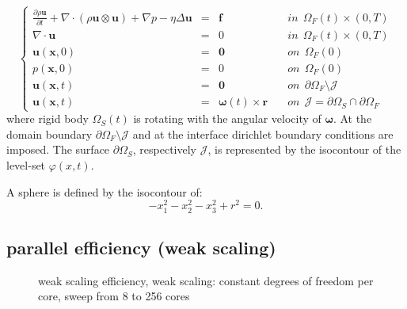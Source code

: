 \documentclass[a4paper,10pt]{report} %
\renewcommand{\vec}[1]{\textbf{#1}}
\newcommand{\Interface}{\mathcal{J}}
\begin{document}
\begin{equation}
\left\{ \begin{array} {rclll}
\frac{\partial \rho \vec{u}}{\partial t}+ \nabla \cdot ( \rho \vec{u} \otimes \vec{u}) + \nabla p - \eta \Delta \vec{u} & = & \vec{f} \quad & in \ \ \Omega_F(t) \times (0,T) \\
\nabla \cdot \vec{u} & = & 0 \quad & in \ \ \Omega_F(t) \times (0,T) \\
\vec{u}(\vec{x},0) & = & \vec{0} \quad & on \ \ \Omega_F(0) \\
p(\vec{x},0) & = & 0 \quad & on \ \ \Omega_F(0) \\
\vec{u}(\vec{x},t) & = & \vec{0} \quad & on \ \ \partial\Omega_F \setminus \Interface \\
\vec{u}(\vec{x},t) & = & \boldsymbol{\omega}(t) \times \vec{r} \quad & on \ \ \Interface = \partial\Omega_S \cap \partial\Omega_F 
\end{array} \right.
\end{equation}
where rigid body $\Omega_S(t)$ is rotating with the angular velocity of $\boldsymbol{\omega}$. At the domain boundary $\partial\Omega_F \setminus \Interface$ and at the interface dirichlet boundary conditions are imposed. The surface $\partial \Omega_S$, respectively $\Interface$, is represented by the isocontour of the level-set $\varphi(x,t)$.

A sphere is defined by the isocontour of: 
\begin{equation}
	-x_1^2-x_2^2-x_3^2+r^2=0.
\end{equation}

\subsection{parallel efficiency (weak scaling)}
\begin{figure}[H]
	\centering
	\pgfplotsset{xlabel = cores, ylabel= Efficiency $T(8)/T(P)$, width = 0.6\textwidth, height= 0.45\textwidth}
	
	\caption{weak scaling efficiency, weak scaling: constant degrees of freedom per core, sweep from 8 to 256 cores }
	\label{plt:weak_scaling}
\end{figure}
\end{document}
